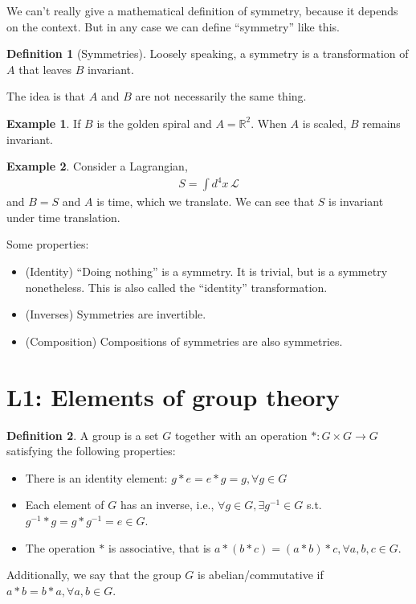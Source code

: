 \documentclass{book}
\theoremstyle{definition}
\newtheorem{defn}{Definition}[section]
\newtheorem{exmp}{Example}[section]
\newcommand{\lag}{\mathcal{L}}
\begin{document}
We can't really give a mathematical definition of symmetry, because it depends on the context. But in any case we can define ``symmetry'' like this.

\begin{defn}[Symmetries]
	Loosely speaking, a symmetry is a transformation of $A$ that leaves $B$ invariant. 
\end{defn}

The idea is that $A$ and $B$ are not necessarily the same thing. 

\begin{exmp}
	If $B$ is the golden spiral and $A = \mathbb{R}^2$. When $A$ is scaled, $B$ remains invariant. 
\end{exmp} 

\begin{exmp}
	Consider a Lagrangian,
	\begin{align}
	S = \int d^4x\,\lag
	\end{align}
	and $B = S$  and $A$ is time, which we translate. We can see that $S$ is invariant under time translation. 
\end{exmp}


Some properties:
\begin{itemize}
	\item (Identity) ``Doing nothing'' is a symmetry. It is trivial, but is a symmetry nonetheless. This is also called the ``identity'' transformation.
	
	\item (Inverses) Symmetries are invertible. 
	
	\item (Composition) Compositions of symmetries are also symmetries. 
\end{itemize}



\section{L1: Elements of group theory}


\begin{defn}
	A group is a set $G$ together with an operation $* : G\times G \to G$ satisfying the following properties:
	\begin{itemize}
		\item There is an identity element: $g*e = e*g = g, \forall g\in G$
		
		\item Each element of $G$ has an inverse, i.e., $\forall g\in G, \exists g^{-1}\in G$ s.t. $g^{-1}* g = g * g^{-1} = e \in G$.
		
		
		\item The operation $*$ is associative, that is  $a*(b*c) = (a*b)*c, \forall a,b,c\in G$.
	\end{itemize}

	Additionally, we say that the group $G$ is abelian/commutative if $a*b = b*a, \forall a,b\in G$. 
\end{defn}
\end{document}
